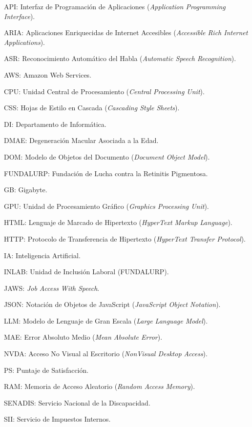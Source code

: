 
{\setlength{\parskip}{0cm}

API: Interfaz de Programación de Aplicaciones (\textit{Application Programming Interface}).

ARIA: Aplicaciones Enriquecidas de Internet Accesibles (\textit{Accessible Rich Internet Applications}).

ASR: Reconocimiento Automático del Habla (\textit{Automatic Speech Recognition}).

AWS: Amazon Web Services.

CPU: Unidad Central de Procesamiento (\textit{Central Processing Unit}).

CSS: Hojas de Estilo en Cascada (\textit{Cascading Style Sheets}).

DI: Departamento de Informática.

DMAE: Degeneración Macular Asociada a la Edad.

DOM: Modelo de Objetos del Documento (\textit{Document Object Model}).

FUNDALURP: Fundación de Lucha contra la Retinitis Pigmentosa.

GB: Gigabyte.

GPU: Unidad de Procesamiento Gráfico (\textit{Graphics Processing Unit}).

HTML: Lenguaje de Marcado de Hipertexto (\textit{HyperText Markup Language}).

HTTP: Protocolo de Transferencia de Hipertexto (\textit{HyperText Transfer Protocol}).

IA: Inteligencia Artificial.

INLAB: Unidad de Inclusión Laboral (FUNDALURP).

JAWS: \textit{Job Access With Speech}.

JSON: Notación de Objetos de JavaScript (\textit{JavaScript Object Notation}).

LLM: Modelo de Lenguaje de Gran Escala (\textit{Large Language Model}).

MAE: Error Absoluto Medio (\textit{Mean Absolute Error}).

NVDA: Acceso No Visual al Escritorio (\textit{NonVisual Desktop Access}).

PS: Puntaje de Satisfacción.

RAM: Memoria de Acceso Aleatorio (\textit{Random Access Memory}).

SENADIS: Servicio Nacional de la Discapacidad.

SII: Servicio de Impuestos Internos.

}
